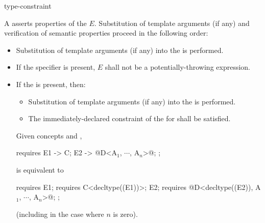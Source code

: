 \begin{bnf}
\br
    \terminal{->} type-constraint
\end{bnf}

\pnum
A  asserts properties
of the  $E$. Substitution
of template arguments (if any) and verification of
semantic properties proceed in the following order:

\begin{itemize}
\item
Substitution of template arguments (if any)
into the  is performed.

\item
If the  specifier is present,
$E$ shall not be a potentially-throwing expression.

\item
If the  is present, then:

\begin{itemize}
\item
Substitution of template arguments (if any)
into the  is performed.

\item
The immediately-declared constraint
of the  for 
shall be satisfied.
\end{itemize}
\begin{example}
Given concepts  and ,
\begin{codeblock}
requires {
  { E1 } -> C;
  { E2 } -> @D<A$_1$, $\cdots$, A$_n$>@;
};
\end{codeblock}
is equivalent to
\begin{codeblock}
requires {
  E1; requires C<decltype((E1))>;
  E2; requires @D<decltype((E2)), A$_1$, $\cdots$, A$_n$>@;
};
\end{codeblock}
(including in the case where $n$ is zero).
\end{example}
\end{itemize}
\pnum
